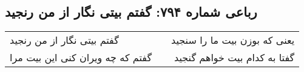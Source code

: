 \begin{center}
\section*{رباعی شماره ۷۹۴: گفتم بیتی نگار از من رنجید}
\label{sec:0794}
\begin{longtable}{l p{0.5cm} r}
گفتم بیتی نگار از من رنجید
&&
یعنی که بوزن بیت ما را سنجید
\\
گفتم که چه ویران کنی این بیت مرا
&&
گفتا به کدام بیت خواهم گنجید
\\
\end{longtable}
\end{center}
